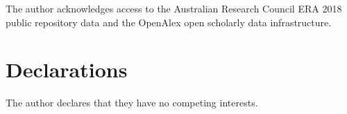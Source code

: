 \documentclass[sn-mathphys-num]{sn-jnl}%
\begin{document}

\maketitle







\backmatter

The author acknowledges access to the Australian Research Council ERA 2018 public repository data and the OpenAlex open scholarly data infrastructure.

\section*{Declarations}
The author declares that they have no competing interests.

\end{document}
